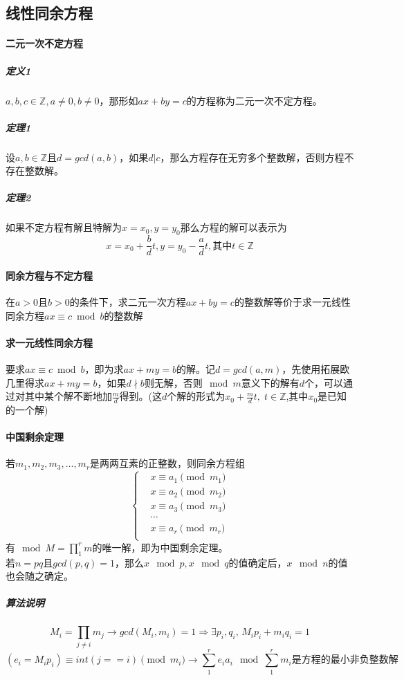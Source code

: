 \documentclass[]{cpp}
\begin{document}
\subsection{线性同余方程}
\paragraph{二元一次不定方程}
\subparagraph{定义1} $a,b,c\in\mathbb{Z},a\ne0,b\ne0$，那形如$ax+by=c$的方程称为二元一次不定方程。
\subparagraph{定理1} 设$a,b\in\mathbb{Z}$且$d=gcd(a,b)$，如果$d|c$，那么方程存在无穷多个整数解，否则方程不存在整数解。
\subparagraph{定理2} 如果不定方程有解且特解为$x=x_0,y=y_0$那么方程的解可以表示为$$x=x_0+\frac{b}{d}t,y=y_0-\frac{a}{d}t,\mbox{其中}t\in\mathbb{Z}$$
\paragraph{同余方程与不定方程} 在$a>0$且$b>0$的条件下，求二元一次方程$ax+by=c$的整数解等价于求一元线性同余方程$ax\equiv c\bmod{b}$的整数解
\paragraph{求一元线性同余方程}
	要求$ax\equiv c\bmod{b}$，即为求$ax+my=b$的解。记$d=gcd(a,m)$，先使用拓展欧几里得求$ax+my=b$，如果$d\nmid b$则无解，否则$\mod m$意义下的解有$d$个，可以通过对其中某个解不断地加$\frac{m}{d}$得到。(这$d$个解的形式为$x_0+\frac{m}{d}t,\;t\in\mathbb{Z}$,其中$x_0$是已知的一个解)
\paragraph{中国剩余定理}
	若$m_1,m_2,m_3,\ldots,m_r$是两两互素的正整数，则同余方程组
	\begin{equation}
	\left\{
	\begin{aligned}
		& x\equiv a_1\pmod{m_1}\\
		& x\equiv a_2\pmod{m_2}\\
		& x\equiv a_3\pmod{m_3}\\
		& \cdots\\
		& x\equiv a_r\pmod{m_r}\\
	\end{aligned}
	\right.
	\end{equation}
	有$\mod M=\prod\limits_1^r m$的唯一解，即为中国剩余定理。\\
	若$n=pq$且$gcd(p,q)=1$，那么$x\mod p,x\mod q$的值确定后，$x\mod n$的值也会随之确定。
\subparagraph{算法说明}
	$$M_i=\prod\limits_{j\ne i}m_j\to gcd(M_i,m_i)=1\Rightarrow \exists p_i,q_i,\,M_ip_i+m_iq_i=1$$
	$$(e_i=M_i p_i)\equiv int(j==i)\pmod{m_i} \to \sum\limits_1^r e_i a_i\mod{\sum\limits_1^r m_i}\mbox{是方程的最小非负整数解}$$
\end{document}
